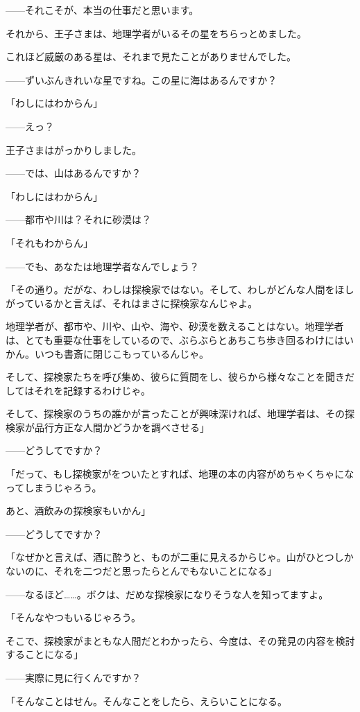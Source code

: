 ——それこそが、本当の仕事だと思います。

それから、王子さまは、地理学者がいるその星をちらっとめました。

これほど威厳のある星は、それまで見たことがありませんでした。

——ずいぶんきれいな星ですね。この星に海はあるんですか？

「わしにはわからん」

——えっ？

王子さまはがっかりしました。

——では、山はあるんですか？

「わしにはわからん」

——都市や川は？それに砂漠は？

「それもわからん」

——でも、あなたは地理学者なんでしょう？

「その通り。だがな、わしは探検家ではない。そして、わしがどんな人間をほしがっているかと言えば、それはまさに探検家なんじゃよ。

地理学者が、都市や、川や、山や、海や、砂漠を数えることはない。地理学者は、とても重要な仕事をしているので、ぶらぶらとあちこち歩き回るわけにはいかん。いつも書斎に閉じこもっているんじゃ。

そして、探検家たちを呼び集め、彼らに質問をし、彼らから様々なことを聞きだしてはそれを記録するわけじゃ。

そして、探検家のうちの誰かが言ったことが興味深ければ、地理学者は、その探検家が品行方正な人間かどうかを調べさせる」

——どうしてですか？


「だって、もし探検家がをついたとすれば、地理の本の内容がめちゃくちゃになってしまうじゃろう。

あと、酒飲みの探検家もいかん」

——どうしてですか？

「なぜかと言えば、酒に酔うと、ものが二重に見えるからじゃ。山がひとつしかないのに、それを二つだと思ったらとんでもないことになる」

——なるほど……。ボクは、だめな探検家になりそうな人を知ってますよ。

「そんなやつもいるじゃろう。

そこで、探検家がまともな人間だとわかったら、今度は、その発見の内容を検討することになる」

——実際に見に行くんですか？

「そんなことはせん。そんなことをしたら、えらいことになる。

